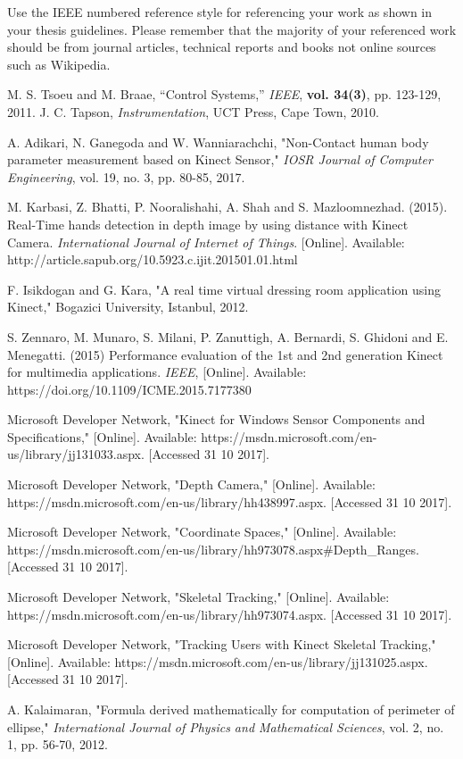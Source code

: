 Use the IEEE numbered reference style for referencing your work as shown in your thesis guidelines.
Please remember that the majority of your referenced work should be from journal articles, technical
reports and books not online sources such as Wikipedia.

\begin{thebibliography}{5}
 M. S. Tsoeu and M. Braae, ``Control Systems,'' \emph{IEEE}, {\bf vol. 34(3)}, pp. 123-129, 2011.
 J. C. Tapson, \emph{Instrumentation}, UCT Press, Cape Town, 2010.

 A. Adikari, N. Ganegoda and W. Wanniarachchi, "Non-Contact human body parameter measurement based on Kinect Sensor," \emph{IOSR Journal of Computer Engineering}, vol. 19, no. 3, pp. 80-85, 2017. 

 M. Karbasi, Z. Bhatti, P. Nooralishahi, A. Shah and S. Mazloomnezhad. (2015). Real-Time hands detection in depth image by using distance with Kinect Camera. \emph{International Journal of Internet of Things}. [Online]. Available: http://article.sapub.org/10.5923.c.ijit.201501.01.html

 F. Isikdogan and G. Kara, "A real time virtual dressing room application using Kinect," Bogazici University, Istanbul, 2012.

 S. Zennaro, M. Munaro, S. Milani, P. Zanuttigh, A. Bernardi, S. Ghidoni and E. Menegatti. (2015) Performance evaluation of the 1st and 2nd generation Kinect for multimedia applications. \emph{IEEE}, [Online]. Available: https://doi.org/10.1109/ICME.2015.7177380

 Microsoft Developer Network, "Kinect for Windows Sensor Components and Specifications," [Online]. Available: https://msdn.microsoft.com/en-us/library/jj131033.aspx. [Accessed 31 10 2017].

 Microsoft Developer Network, "Depth Camera," [Online]. Available: https://msdn.microsoft.com/en-us/library/hh438997.aspx. [Accessed 31 10 2017].

 Microsoft Developer Network, "Coordinate Spaces," [Online]. Available: https://msdn.microsoft.com/en-us/library/hh973078.aspx\#Depth\_Ranges. [Accessed 31 10 2017].

 Microsoft Developer Network, "Skeletal Tracking," [Online]. Available: https://msdn.microsoft.com/en-us/library/hh973074.aspx. [Accessed 31 10 2017].

 Microsoft Developer Network, "Tracking Users with Kinect Skeletal Tracking," [Online]. Available: https://msdn.microsoft.com/en-us/library/jj131025.aspx. [Accessed 31 10 2017].

 A. Kalaimaran, "Formula derived mathematically for computation of perimeter of ellipse," \emph{International Journal of Physics and Mathematical Sciences}, vol. 2, no. 1, pp. 56-70, 2012. 
\end{thebibliography}

